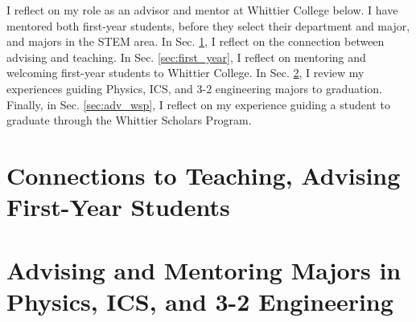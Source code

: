 \documentclass[../../main.tex]{subfiles}
\begin{document}
\label{sec:advising_mentoring}

I reflect on my role as an advisor and mentor at Whittier College below.  I have mentored both first-year students, before they select their department and major, and majors in the STEM area.  In Sec. \ref{sec:adv_teaching}, I reflect on the connection between advising and teaching.  In Sec. \ref{sec:first_year}, I reflect on mentoring and welcoming first-year students to Whittier College.  In Sec. \ref{sec:adv_stem}, I review my experiences guiding Physics, ICS, and 3-2 engineering majors to graduation.  Finally, in Sec. \ref{sec:adv_wsp}, I reflect on my experience guiding a student to graduate through the Whittier Scholars Program.

\section{Connections to Teaching, Advising First-Year Students}
\label{sec:adv_teaching}

%

\begin{flushleft}

\end{flushleft}


%

%

\section{Advising and Mentoring Majors in Physics, ICS, and 3-2 Engineering}
\label{sec:adv_stem}

%
\end{document}
